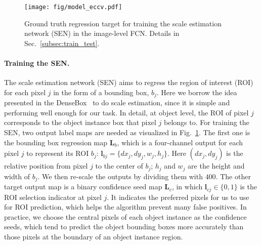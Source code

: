 \documentclass[runningheads]{llncs}
\newcommand{\ve}[1]{{\mathbf #1}}
\begin{document}
\begin{figure}[!t]
\begin{center}
\texttt{[image: fig/model\_eccv.pdf]}
\end{center}
\vspace{-1\baselineskip}
\caption{Ground truth regression target for training the scale estimation network (SEN) in the image-level FCN. Details in Sec.~\ref{subsec:train_test}.}
\vspace{-1.6\baselineskip}
\label{fig:train_sen}
\end{figure}

\paragraph{Training the SEN.}
The scale estimation network (SEN) aims to regress the region of interest (ROI) for each pixel $j$ in the form of a bounding box, $b_j$. Here we borrow the idea presented in the DenseBox~\cite{huang2015densebox} to do scale estimation, since it is simple and performing well enough for our task. 
In detail, at object level, the ROI of pixel $j$ corresponds to the object instance box that pixel $j$ belongs to. For training the SEN, two output label maps are needed as visualized in Fig.~\ref{fig:train_sen}. The first one is the bounding box regression map $\ve{L}_{b}$, which is a four-channel output for each pixel $j$ to represent its ROI $b_j$: $\ve{l}_{bj}=\{dx_j, dy_j, w_j, h_j\}$. Here $(dx_j, dy_j)$ is the relative position from pixel $j$ to the center of $b_j$; $h_j$ and $w_j$ are the height and width of $b_j$. We then re-scale the outputs by dividing them with $400$. 
The other target output map is a binary confidence seed map $\ve{L}_{c}$, in which $\ve{l}_{cj}\in\{0,1\}$ is the ROI selection indicator at pixel $j$. It indicates the preferred pixels for us to use for ROI prediction, which helps the algorithm prevent many false positives. In practice, we choose the central pixels of each object instance as the confidence seeds, which tend to predict the object bounding boxes more accurately than those pixels at the boundary of an object instance region. 
\end{document}
